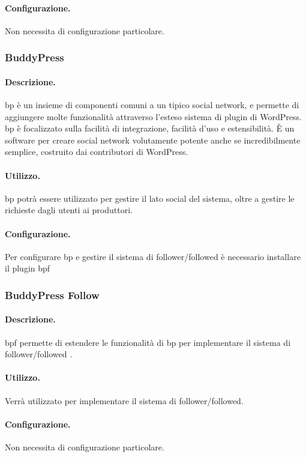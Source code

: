 \paragraph{Configurazione.} Non necessita di configurazione particolare.

\subsubsection{BuddyPress} \label{plugin:bp}
\paragraph{Descrizione.}
\gls{bp} è un insieme di componenti comuni a un tipico social network, e permette di aggiungere molte funzionalità attraverso l'esteso sistema di plugin di WordPress.
\gls{bp} è focalizzato sulla facilità di integrazione, facilità d'uso e estensibilità. È un software per creare social network volutamente potente anche se incredibilmente semplice, costruito dai contributori di WordPress.
\paragraph{Utilizzo.}
\gls{bp} potrà essere utilizzato per gestire il lato social del sistema, oltre a gestire le richieste dagli utenti ai produttori.
\paragraph{Configurazione.}
Per configurare \gls{bp} e gestire il sistema di follower/followed è necessario installare il plugin \gls{bpf}

\subsubsection{BuddyPress Follow} \label{plugin:bpf}
\paragraph{Descrizione.}
\gls{bpf} permette di estendere le funzionalità di \gls{bp} per implementare il sistema di follower/followed .
\paragraph{Utilizzo.} Verrà utilizzato per implementare il sistema di follower/followed.
\paragraph{Configurazione.} Non necessita di configurazione particolare.

